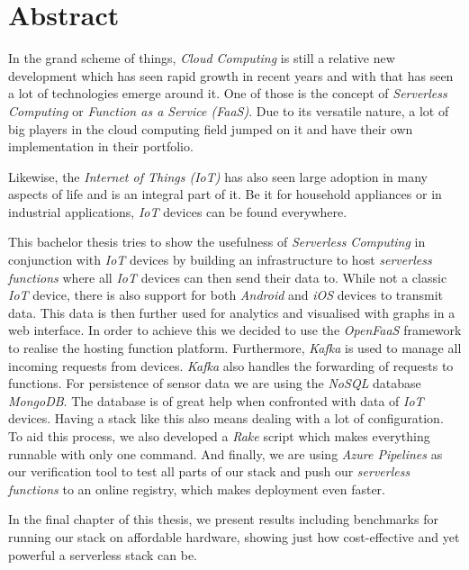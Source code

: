 \section*{Abstract}

In the grand scheme of things, \textit{Cloud Computing} is still a relative new development which
has seen rapid growth in recent years and with that has seen a lot of technologies emerge around it.
One of those is the concept of \textit{Serverless Computing} or \textit{Function as a Service
(FaaS)}. Due to its versatile nature, a lot of big players in the cloud computing field jumped on it
and have their own implementation in their portfolio.

Likewise, the \textit{Internet of Things (IoT)} has also seen large adoption in many aspects of life
and is an integral part of it. Be it for household appliances or in industrial applications,
\textit{IoT} devices can be found everywhere.

This bachelor thesis tries to show the usefulness of \textit{Serverless Computing} in conjunction
with \textit{IoT} devices by building an infrastructure to host \textit{serverless functions} where
all \textit{IoT} devices can then send their data to. While not a classic \textit{IoT} device, there
is also support for both \textit{Android} and \textit{iOS} devices to transmit data. This data is
then further used for analytics and visualised with graphs in a web interface. In order to achieve
this we decided to use the \textit{OpenFaaS} framework to realise the hosting function platform.
Furthermore, \textit{Kafka} is used to manage all incoming requests from devices. \textit{Kafka}
also handles the forwarding of requests to functions. For persistence of sensor data we are using
the \textit{NoSQL} database \textit{MongoDB}. The database is of great help when confronted with
data of \textit{IoT} devices. Having a stack like this also means dealing with a lot of
configuration. To aid this process, we also developed a \textit{Rake} script which makes everything
runnable with only one command. And finally, we are using \textit{Azure Pipelines} as our
verification tool to test all parts of our stack and push our \textit{serverless functions} to an
online registry, which makes deployment even faster.

In the final chapter of this thesis, we present results including benchmarks for running our stack
on affordable hardware, showing just how cost-effective and yet powerful a serverless stack can be.
